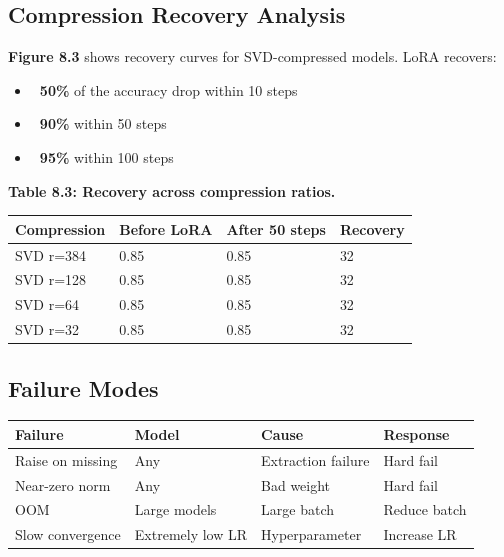 \subsection{Compression Recovery Analysis}

\textbf{Figure 8.3} shows recovery curves for SVD-compressed models. LoRA 
recovers:

\begin{itemize}
\item \textbf{~50\%} of the accuracy drop within 10 steps
\item \textbf{~90\%} within 50 steps
\item \textbf{~95\%} within 100 steps

\end{itemize}
\textbf{Table 8.3: Recovery across compression ratios.}

\begin{table}[H]
\centering
\small
\begin{tabular}{llll}
\toprule
\textbf{Compression} & \textbf{Before LoRA} & \textbf{After 50 steps} & \textbf{Recovery} \\
\midrule
SVD r=384 & 0.85 & 0.85 & 32 \\
SVD r=128 & 0.85 & 0.85 & 32 \\
SVD r=64 & 0.85 & 0.85 & 32 \\
SVD r=32 & 0.85 & 0.85 & 32 \\
\bottomrule
\end{tabular}
\end{table}

\subsection{Failure Modes}

\begin{table}[H]
\centering
\small
\begin{tabular}{llll}
\toprule
\textbf{Failure} & \textbf{Model} & \textbf{Cause} & \textbf{Response} \\
\midrule
Raise on missing & Any & Extraction failure & Hard fail \\
Near-zero norm & Any & Bad weight & Hard fail \\
OOM & Large models & Large batch & Reduce batch \\
Slow convergence & Extremely low LR & Hyperparameter & Increase LR \\
\bottomrule
\end{tabular}
\end{table}

